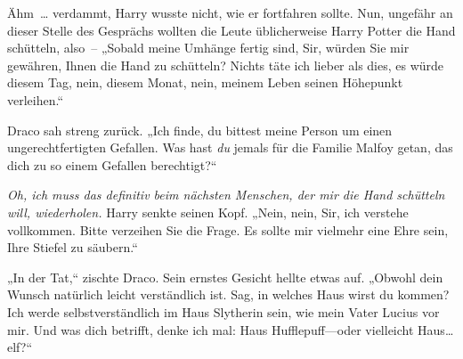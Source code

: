 Ähm … verdammt, Harry wusste nicht, wie er fortfahren sollte. Nun, ungefähr an dieser Stelle des Gesprächs wollten die Leute üblicherweise Harry Potter die Hand schütteln, also – „Sobald meine Umhänge fertig sind, Sir, würden Sie mir gewähren, Ihnen die Hand zu schütteln? Nichts täte ich lieber als dies, es würde diesem Tag, nein, diesem Monat, nein, meinem Leben seinen Höhepunkt verleihen.“

Draco sah streng zurück. „Ich finde, du bittest meine Person um einen ungerechtfertigten Gefallen. Was hast \emph{du} jemals für die Familie Malfoy getan, das dich zu so einem Gefallen berechtigt?“

\emph{Oh, ich muss das definitiv beim nächsten Menschen, der mir die Hand schütteln will, wiederholen.} Harry senkte seinen Kopf. „Nein, nein, Sir, ich verstehe vollkommen. Bitte verzeihen Sie die Frage. Es sollte mir vielmehr eine Ehre sein, Ihre Stiefel zu säubern.“

„In der Tat,“ zischte Draco. Sein ernstes Gesicht hellte etwas auf. „Obwohl dein Wunsch natürlich leicht verständlich ist. Sag, in welches Haus wirst du kommen? Ich werde selbstverständlich im Haus Slytherin sein, wie mein Vater Lucius vor mir. Und was dich betrifft, denke ich mal: Haus Hufflepuff—oder vielleicht Haus…elf?“

